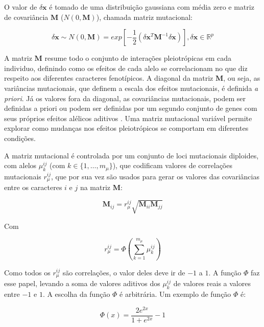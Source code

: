 O valor de $\delta \mathbf{x}$ é tomado de uma distribuição gaussiana com média
zero e matriz de covariância $\mathbf{M}$ ($N(0, \mathbf{M})$), chamada matriz mutacional:

\begin{equation}
    \delta \mathbf{x} \sim N(0, \mathbf{M}) = exp \left[-\frac{1}{2} (\delta \mathbf{x}^T \mathbf{M}^{-1} \delta \mathbf{x})\right] , \delta \mathbf{x} \in \mathbb{R}^p
\end{equation}

A matriz $\mathbf{M}$ resume todo o conjunto de interações pleiotrópicas em cada
individuo, definindo como os efeitos de cada alelo se correlacionam no
que diz respeito aos diferentes caracteres fenotípicos.
A diagonal da matriz $\mathbf{M}$, ou seja, as variâncias mutacionais, que
definem a escala dos efeitos mutacionais, é definida {\it a priori}.
Já os valores fora da diagonal, as covariâncias mutacionais, podem ser
definidas a priori \citep{Jones2003, Jones2004} ou podem ser definidas
por um segundo conjunto de genes com seus próprios efeitos alélicos
aditivos \citep{Jones2007}.
Uma matriz mutacional variável permite explorar como mudanças nos
efeitos pleiotrópicos se comportam em diferentes condições.

A matriz mutacional é controlada por um conjunto de loci
mutacionais diploides, com alelos $\mu^{ij}_k$ (com $k \in \{1,\ldots,m_\mu\}$),
que codificam valores de correlações mutacionais $r_\mu^{ij}$, que por
sua vez são usados para gerar os valores das covariâncias entre os
caracteres $i$ e $j$ na matriz $\mathbf{M}$:

\begin{equation}
    \mathbf{M}_{ij} = r_\mu^{ij} \sqrt {\mathbf{M}_{ii}\mathbf{M}_{jj}}
\end{equation}

Com

\begin{equation}
r_\mu^{ij} = \Phi \left(\sum_{k=1}^{m_\mu} \mu^{ij}_k\right)
\end{equation}

Como todos os $r_\mu^{ij}$ são correlações, o valor deles deve ir de
$-1$ a $1$.
A função $\Phi$ faz esse papel, levando a soma de valores
aditivos dos $\mu^{ij}_k$ de valores reais a valores entre $-1$ e $1$.
A escolha da função $\Phi$ é arbitrária.
Um exemplo de função $\Phi$ \citep[usado em][]{Jones2007} é:

\begin{equation}
\Phi (x) = \frac{2e^{2x}}{1+e^{2x}} - 1
\end{equation}

